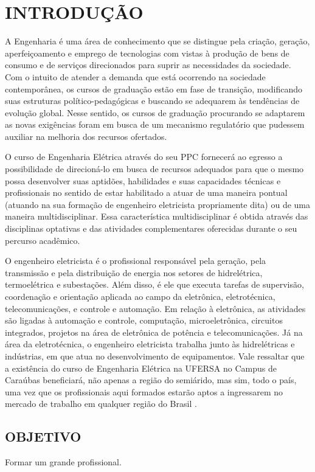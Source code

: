 \chapter{INTRODUÇÃO}

A Engenharia é uma área de conhecimento que se distingue pela criação, geração, aperfeiçoamento e emprego de tecnologias com vistas à produção de bens de consumo e de serviços direcionados para suprir as necessidades da sociedade. Com o intuito de atender a demanda que está ocorrendo na sociedade contemporânea, os cursos de graduação estão em fase de transição, modificando suas estruturas político-pedagógicas e buscando se adequarem às tendências de evolução global. Nesse sentido, os cursos de graduação procurando se adaptarem as novas exigências foram em busca de um mecanismo regulatório que pudessem auxiliar na melhoria dos recursos ofertados.

O curso de Engenharia Elétrica através do seu PPC fornecerá ao egresso a possibilidade de direcioná-lo em busca de recursos adequados para que o mesmo possa desenvolver suas aptidões, habilidades e suas capacidades técnicas e profissionais no sentido de estar habilitado a atuar de uma maneira pontual (atuando na sua formação de engenheiro eletricista propriamente dita) ou de uma maneira multidisciplinar. Essa característica multidisciplinar é obtida através das disciplinas optativas e das atividades complementares oferecidas durante o seu percurso acadêmico.

O engenheiro eletricista é o profissional responsável pela geração, pela transmissão e pela distribuição de energia nos setores de hidrelétrica, termoelétrica e subestações. Além disso, é ele que executa tarefas de supervisão, coordenação e orientação aplicada ao campo da eletrônica, eletrotécnica, telecomunicações, e controle e automação. Em relação à eletrônica, as atividades são ligadas à automação e controle, computação, microeletrônica, circuitos integrados, projetos na área de eletrônica de potência e telecomunicações. Já na área da eletrotécnica, o engenheiro eletricista trabalha junto às hidrelétricas e indústrias, em que atua no desenvolvimento de equipamentos.
Vale ressaltar que a existência do curso de Engenharia Elétrica na UFERSA no Campus de Caraúbas beneficiará, não apenas a região do semiárido, mas sim, todo o país, uma vez que os profissionais aqui formados estarão aptos a ingressarem no mercado de trabalho em qualquer região do Brasil  \cite{ref:ufersa-caraubas}.

\section{OBJETIVO}

Formar um grande profissional.
